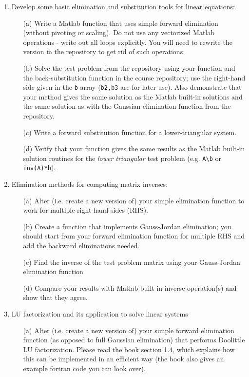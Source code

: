 \documentclass{article}
\begin{document}
\pagebreak

\begin{enumerate}
  \item Develop some basic elimination and substitution tools for linear equations:   
  \begin{itemize}
    \item[(a)] Write a Matlab function that uses simple forward elimination (without pivoting or scaling).  Do not use any vectorized Matlab operations - write out all loops explicitly.  You will need to rewrite the version in the repository to get rid of such operations.  
    \item[(b)] Solve the test problem from the repository using your function and the back-substitution function in the course repository; use the right-hand side given in the \texttt{b} array (\texttt{b2,b3} are for later use).   Also demonstrate that your method gives the same solution as the Matlab built-in solutions and the same solution as with the Gaussian elimination function from the repository. 
    \item[(c)] Write a forward substitution function for a lower-triangular system.  
    \item[(d)] Verify that your function gives the same results as the Matlab built-in solution routines for the \emph{lower triangular} test problem (e.g. \texttt{A\textbackslash b} or \texttt{inv(A)*b}).  
  \end{itemize}
  \item Elimination methods for computing matrix inverses:  
  \begin{itemize}
    \item[(a)] Alter (i.e. create a new version of) your simple elimination function to work for multiple right-hand sides (RHS).  
    \item[(b)] Create a function that implements Gauss-Jordan elimination; you should start from your forward elimination function for multiple RHS and add the backward eliminations needed.  
    \item[(c)] Find the inverse of the test problem matrix using your Gauss-Jordan elimination function
    \item[(d)] Compare your results with Matlab built-in inverse operation(s) and show that they agree.
  \end{itemize}
  \item LU factorization and its application to solve linear systems
  \begin{itemize}
    \item[(a)] Alter (i.e. create a new version of) your simple forward elimination function (as opposed to full Gaussian elimination) that performs Doolittle LU factorization.  Please read the book section 1.4, which explains how this can be implemented in an efficient way (the book also gives an example fortran code you can look over).  

\end{itemize}
\end{enumerate}
\end{document}
